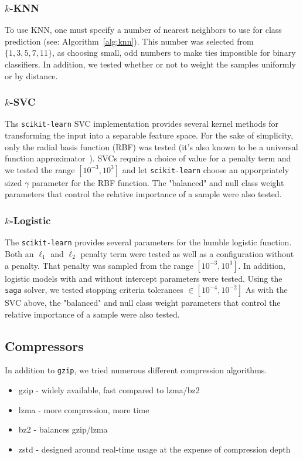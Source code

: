 \documentclass{article}
\begin{document}
\label{models}
\subsubsection{$k$-KNN}
To use KNN, one must specify a number of nearest neighbors to use for class prediction (see: Algorithm~\ref{alg:knn}). This number was selected from $\{1,3,5,7,11\}$, as choosing small, odd numbers to make ties impossible for binary classifiers. In addition, we tested whether or not to weight the samples uniformly or by distance. 

\subsubsection{$k$-SVC}
Ths \texttt{scikit-learn} SVC implementation provides several kernel methods for transforming the input into a separable feature space. 
For the sake of simplicity, only the radial basis function (RBF) was tested (it's also known to be a universal function approximator~\cite{}). 
SVCs require a choice of value for a penalty term and we tested the range $[ 10^{-3}, 10^3]$ and let \texttt{scikit-learn} choose an apporpriately sized $\gamma$ parameter for the RBF function. 
The "balanced" and null class weight parameters that control the relative importance of a sample were also tested.

\subsubsection{$k$-Logistic}
The \texttt{scikit-learn} provides several parameters for the humble logistic function. Both an $\ell_1$ and $\ell_2$ penalty term were tested as well as a configuration without a penalty. That penalty was sampled from the range $[10^{-3}, 10^3]$. In addition, logistic models with and without intercept parameters were tested. Using the \texttt{saga} solver, we tested stopping criteria tolerances $\in [10^{-4}, 10^{-2}]$
As with the SVC above, the "balanced" and null class weight parameters that control the relative importance of a sample were also tested.

\subsection{Compressors} In addition to \texttt{gzip}, we tried numerous different compression algorithms. 
\begin{itemize}
    \item gzip - widely available, fast compared to lzma/bz2
    \item lzma - more compression, more time
    \item bz2 - balances gzip/lzma
    \item zstd - designed around real-time usage at the expense of compression depth
\end{itemize}
\end{document}
